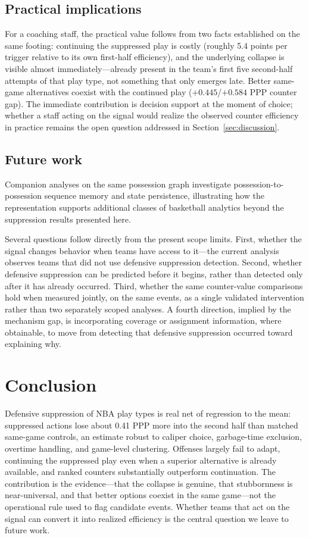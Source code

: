 \documentclass[11pt]{article}
\begin{document}
\subsection{Practical implications}

For a coaching staff, the practical value follows from two facts established on the same footing: continuing the suppressed play is costly (roughly 5.4 points per trigger relative to its own first-half efficiency), and the underlying collapse is visible almost immediately---already present in the team's first five second-half attempts of that play type, not something that only emerges late. Better same-game alternatives coexist with the continued play ($+0.445$/$+0.584$ PPP counter gap). The immediate contribution is decision support at the moment of choice; whether a staff acting on the signal would realize the observed counter efficiency in practice remains the open question addressed in Section~\ref{sec:discussion}.

\subsection{Future work}

Companion analyses on the same possession graph investigate possession-to-possession sequence memory and state persistence, illustrating how the representation supports additional classes of basketball analytics beyond the suppression results presented here.

Several questions follow directly from the present scope limits. First, whether the signal changes behavior when teams have access to it---the current analysis observes teams that did not use defensive suppression detection. Second, whether defensive suppression can be predicted before it begins, rather than detected only after it has already occurred. Third, whether the same counter-value comparisons hold when measured jointly, on the same events, as a single validated intervention rather than two separately scoped analyses. A fourth direction, implied by the mechanism gap, is incorporating coverage or assignment information, where obtainable, to move from detecting that defensive suppression occurred toward explaining why.

\section{Conclusion}
\label{sec:conclusion}

Defensive suppression of NBA play types is real net of regression to the mean: suppressed actions lose about 0.41 PPP more into the second half than matched same-game controls, an estimate robust to caliper choice, garbage-time exclusion, overtime handling, and game-level clustering. Offenses largely fail to adapt, continuing the suppressed play even when a superior alternative is already available, and ranked counters substantially outperform continuation. The contribution is the evidence---that the collapse is genuine, that stubbornness is near-universal, and that better options coexist in the same game---not the operational rule used to flag candidate events. Whether teams that act on the signal can convert it into realized efficiency is the central question we leave to future work.
\end{document}

